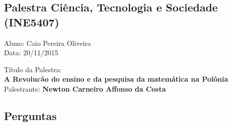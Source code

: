 \documentclass{article}
\begin{document}
\begin{center}
\section*{Palestra Ciência, Tecnologia e Sociedade (INE5407)}
\begin{center}
Aluno: Caio Pereira Oliveira
\\Data: 20/11/2015
\end{center}

\begin{center}
Título da Palestra: \\ {\bf A Revolucão do ensino e da pesquisa da matemática na Polônia}
Palestrante: {\bf Newton Carneiro Affonso da Costa}
\end{center}

\subsection*{Perguntas}

\end{center}
\end{document}
